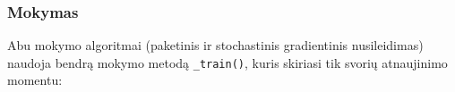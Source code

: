 \subsubsection{Mokymas}
\label{subsubsec:mokymas}

Abu mokymo algoritmai (paketinis ir stochastinis gradientinis nusileidimas) naudoja bendrą mokymo metodą \texttt{\_train()}, kuris skiriasi tik svorių atnaujinimo momentu:


\newline

